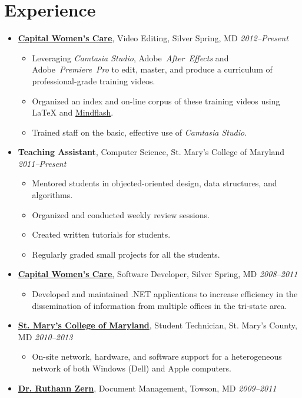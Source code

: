 \documentclass[11pt,letterpaper]{article}
\makeatletter
\newcommand{\position}[5]{\item%
  \begin{tabular*}{1.0\linewidth}{l@{\extracolsep{\fill}}r}
    #1 & #2\\
    \textit{#3} & \textit{#4---#5}
  \end{tabular*}}
\renewcommand{\position}[6][\textbullet]{%
\item[#1] \hspace*{-2em}\textbf{#2}, #4, #3\hfill
  \textit{#5--#6}\vspace*{-.8em}}
\newcommand{\cwc}{\href{http://www.cwcare.net}{Capital Women's Care}}
\newcommand{\software}[1]{\textsl{#1}}
\makeatother
\begin{document}
\section*{Experience}
\begin{itemize}
\position \cwc
          {Silver Spring, MD}
          {Video Editing}
          {2012}{Present}
          \begin{itemize}
          \item Leveraging \software{Camtasia Studio},
            Adobe~\software{After~Effects} and
            Adobe~\software{Premiere~Pro} to edit, master, and produce
            a curriculum of professional-grade training videos.
          \item Organized an index and on-line corpus of these training
            videos using \LaTeX{} and
            \href{http://www.mindflash.com/}{Mindflash}.
          \item Trained staff on the basic, effective use of
            \software{Camtasia Studio}.
          \end{itemize}

\position {Teaching Assistant}
          {St. Mary's College of Maryland}
          {Computer Science}
          {2011}{Present}
          \begin{itemize}
          \item Mentored students in objected-oriented design, data
            structures, and algorithms.
          \item Organized and conducted weekly review sessions.
          \item Created written tutorials for students.
          \item Regularly graded small projects for all the students.
          \end{itemize}

\position \cwc
          {Silver Spring, MD}
          {Software Developer}
          {2008}{2011}
          \begin{itemize}
          \item Developed and maintained .NET applications to increase
            efficiency in the dissemination of information from
            multiple offices in the tri-state area.
          \end{itemize}

\position {\href{http://oit.smcm.edu}
                {St. Mary's College of Maryland}}
          {St. Mary's County, MD}
          {Student Technician}
          {2010}{2013}
          \begin{itemize}
          \item On-site network, hardware, and software support for a
            heterogeneous network of both Windows (Dell) and Apple
            computers.
          \end{itemize}

\position {\href{http://www.cwcare.net/Provider.aspx?pid=1269}
                {Dr. Ruthann Zern}}
          {Towson, MD}
          {Document Management}
          {2009}{2011}
\end{itemize}
\end{document}
